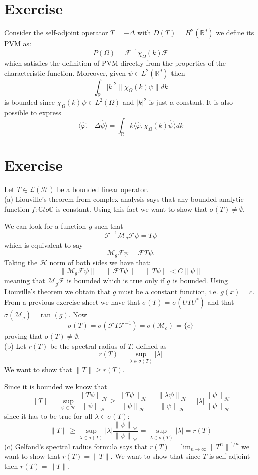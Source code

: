 \documentclass{article}
\newcommand{\R}{\mathbb{R}}
\newcommand{\C}{\mathbb{C}}
\newcommand{\F}{\mathcal{F}}
\begin{document}
\section{Exercise}
Consider the self-adjoint operator $T = - \Delta$ with $D(T) = H^2(\R^d)$ we define its PVM as:
\[
    P(\Omega) = \F^{-1}\chi_\Omega (k) \F
\]
which satisfies the definition of PVM directly from the properties of the characteristic function. Moreover, given $\psi \in L^2(\R^d)$ then
\[
    \int_\R |k|^2 \| \chi_\Omega(k) \psi \| dk 
\]
is bounded since $\chi_\Omega(k) \psi \in L^2 (\Omega)$ and $|k|^2$ is just a constant. It is also possible to express 
\[
    \langle \hat\varphi, -\Delta \hat\psi \rangle = \int_\R k \langle \hat\varphi, \chi_{\Omega} (k) \hat \psi \rangle dk
\]
\section{Exercise}
Let $T \in \mathcal{L}(\mathcal{H})$ be a bounded linear operator.\\
(a) Liouville’s theorem from complex analysis says that any bounded analytic function $f:\C to \C$ is constant. Using this fact we want to show that $\sigma(T) \neq \emptyset$.

We can look for a function $g$ such that
\[
    \F^{-1} \mathcal{M}_g \F \psi = T \psi
\]
which is equivalent to say 
\[
    \mathcal{M}_g \F \psi = \F T \psi.
\]
Taking the $\mathcal{H}$ norm of both sides we have that:
\[
    \|\mathcal{M}_g \F \psi\| =  \| \F T \psi \| = \| T\psi \|< C \| \psi\|
\]
meaning that $\mathcal{M}_g \F$ is bounded which is true only if $g$ is bounded. Using Liouville’s theorem we obtain that $g$ must be a constant function, i.e. $g(x) = c$. From a previous exercise sheet we have that $\sigma(T) = \sigma (U T U^*)$ and that $\sigma(\mathcal{M}_g) = \overline{\mbox{ran }(g)}$. Now
\[
    \sigma(T) = \sigma(\F T \F^{-1}) = \sigma(\mathcal{M}_c) = \{ c \}
\]
proving that $\sigma(T) \neq \emptyset$.\\
(b) Let $r(T)$ be the spectral radius of $T$, defined as
\[
    r(T) = \sup_{\lambda \in \sigma(T)} |\lambda|
\]
We want to show that $\|T\|\geq r(T)$.

Since it is bounded we know that 
\[
    \| T \| = \sup_{\psi \in \mathcal{H}} \frac{{\| T \psi\|}_\mathcal{H}}{{\| \psi \|}_\mathcal{H}} \geq \frac{{\| T \psi\|}_\mathcal{H}}{{\| \psi \|}_\mathcal{H}} = \frac{{\| \lambda \psi\|}_\mathcal{H}}{{\| \psi \|}_\mathcal{H}} = |\lambda| \frac{{\|\psi\|}_\mathcal{H}}{{\| \psi \|}_\mathcal{H}}
\]
since it has to be true for all $\lambda \in \sigma(T)$:
\[
    \| T \| \geq \sup_{\lambda \in \sigma(T)} |\lambda| \frac{{\|\psi\|}_\mathcal{H}}{{\| \psi \|}_\mathcal{H}} = \sup_{\lambda \in \sigma(T)} |\lambda| = r(T)
\]
(c) Gelfand’s spectral radius formula says that $r(T) = \lim_{n\to \infty} {\| T^n \|}^{1/n}$ we want to show that $r(T) = \|T\|$. We want to show that since $T$ is self-adjoint then $r(T) = \|T\|$.
\end{document}

